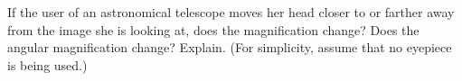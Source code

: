 If the user of an astronomical telescope moves her head
closer to or farther away from the image she is looking at,
does the magnification change? Does the angular magnification
change? Explain. (For simplicity, assume that no eyepiece is being used.)
